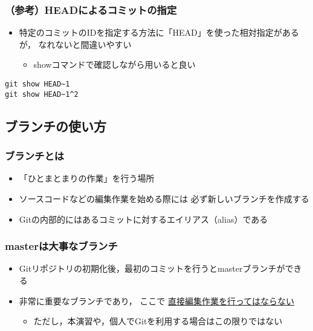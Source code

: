 \documentclass[a4paper,twoside,twocolumn]{bxjsarticle}
\begin{document}
\subsubsection{（参考）HEADによるコミットの指定}
\label{sec-1-5-5}
\begin{itemize}
\item 特定のコミットのIDを指定する方法に「HEAD」を使った相対指定があるが，
なれないと間違いやすい
\begin{itemize}
\item showコマンドで確認しながら用いると良い
\end{itemize}
\end{itemize}

\begin{verbatim}
git show HEAD~1
git show HEAD~1^2
\end{verbatim}

\subsection{ブランチの使い方}
\label{sec-1-6}
\subsubsection{ブランチとは}
\label{sec-1-6-1}
\begin{itemize}
\item 「ひとまとまりの作業」を行う場所
\item ソースコードなどの編集作業を始める際には
必ず新しいブランチを作成する
\item Gitの内部的にはあるコミットに対するエイリアス（alias）である
\end{itemize}

\subsubsection{masterは大事なブランチ}
\label{sec-1-6-2}
\begin{itemize}
\item Gitリポジトリの初期化後，最初のコミットを行うとmasterブランチができる
\item 非常に重要なブランチであり，
ここで \uline{直接編集作業を行ってはならない}
\begin{itemize}
\item ただし，本演習や，個人でGitを利用する場合はこの限りではない
\end{itemize}
\end{itemize}
\end{document}
